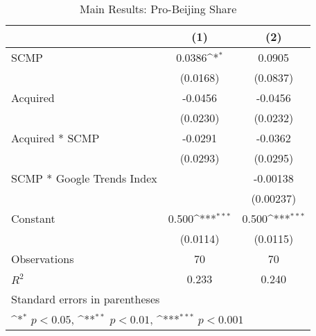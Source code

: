 \begin{table}[htbp]\centering
\def\sym#1{\ifmmode^{#1}\else\(^{#1}\)\fi}
\caption{Main Results: Pro-Beijing Share\label{pb}}
\begin{tabular*}{0.75\textwidth}{@{\hskip\tabcolsep\extracolsep\fill}l*{2}{c}}
\hline\hline
                &\multicolumn{1}{c}{(1)}         &\multicolumn{1}{c}{(2)}         \\
\hline
SCMP            &   0.0386\sym{*}  &   0.0905         \\
                & (0.0168)         & (0.0837)         \\
[1em]
Acquired        &  -0.0456         &  -0.0456         \\
                & (0.0230)         & (0.0232)         \\
[1em]
Acquired * SCMP &  -0.0291         &  -0.0362         \\
                & (0.0293)         & (0.0295)         \\
[1em]
SCMP * Google Trends Index&                  & -0.00138         \\
                &                  &(0.00237)         \\
[1em]
Constant        &    0.500\sym{***}&    0.500\sym{***}\\
                & (0.0114)         & (0.0115)         \\
\hline
Observations    &       70         &       70         \\
\(R^{2}\)       &    0.233         &    0.240         \\
\hline\hline
\multicolumn{3}{l}{\footnotesize Standard errors in parentheses}\\
\multicolumn{3}{l}{\footnotesize \sym{*} \(p<0.05\), \sym{**} \(p<0.01\), \sym{***} \(p<0.001\)}\\
\end{tabular*}
\end{table}
